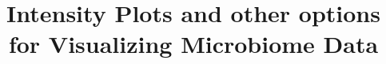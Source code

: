 \documentclass[doublespacing]{bmcart}
\begin{document}
\begin{frontmatter}

\begin{fmbox}


\title{Intensity Plots and other options for Visualizing Microbiome Data}


\author[
   noteref={n1},                        %
]{ }
\author[
    noteref={n1},
]{ }
\author[
   addressref={aff1},
]{ }
\author[
   addressref={aff1},
corref={aff1},   %
  noteref={n1},
  email={lata@uwyo.edu}
]{ }






\address[id=aff1]{%
  , %
  ,                     %
  ,                              %
}





\end{fmbox}
\end{frontmatter}
\end{document}
